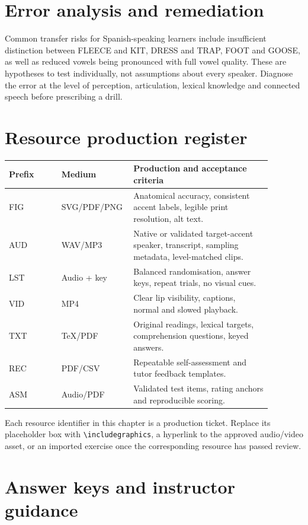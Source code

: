 \section{Error analysis and remediation}
Common transfer risks for Spanish-speaking learners include insufficient distinction between FLEECE and KIT, DRESS and TRAP, FOOT and GOOSE, as well as reduced vowels being pronounced with full vowel quality. These are hypotheses to test individually, not assumptions about every speaker. Diagnose the error at the level of perception, articulation, lexical knowledge and connected speech before prescribing a drill.
\section{Resource production register}
\begin{longtable}{p{0.19\linewidth}p{0.19\linewidth}p{0.5\linewidth}}
\toprule Prefix & Medium & Production and acceptance criteria\\\midrule\endhead
FIG & SVG/PDF/PNG & Anatomical accuracy, consistent accent labels, legible print resolution, alt text.\\
AUD & WAV/MP3 & Native or validated target-accent speaker, transcript, sampling metadata, level-matched clips.\\
LST & Audio + key & Balanced randomisation, answer keys, repeat trials, no visual cues.\\
VID & MP4 & Clear lip visibility, captions, normal and slowed playback.\\
TXT & TeX/PDF & Original readings, lexical targets, comprehension questions, keyed answers.\\
REC & PDF/CSV & Repeatable self-assessment and tutor feedback templates.\\
ASM & Audio/PDF & Validated test items, rating anchors and reproducible scoring.\\
\bottomrule\end{longtable}
\noindent Each resource identifier in this chapter is a production ticket. Replace its placeholder box with \verb|\includegraphics|, a hyperlink to the approved audio/video asset, or an imported exercise once the corresponding resource has passed review.
\section{Answer keys and instructor guidance}

